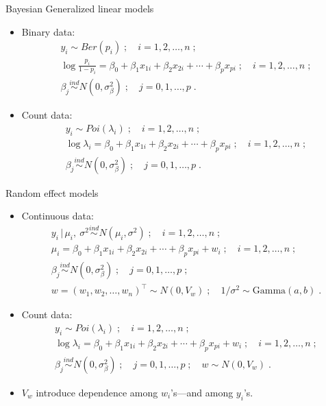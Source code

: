 \documentclass[10pt]{beamer}
\newcommand{\given}{\, | \,}
\begin{document}
\begin{frame}{Bayesian Generalized linear models}
 
 \begin{itemize}
  \item Binary data:
  \begin{multline*}
   y_i \sim Ber(p_i)\;;\quad i=1,2,\ldots,n\;;\\
   \log\frac{p_i}{1-p_i} = \beta_0 + \beta_1 x_{1i} + \beta_2 x_{2i} + \cdots + \beta_p x_{pi}\;;\quad i=1,2,\ldots,n\;; \\
   \beta_j \stackrel{ind}{\sim} N(0, \sigma^2_{\beta})\;; \quad j=0,1,\ldots,p\;. 
  \end{multline*}

  \item Count data:
  \begin{multline*}
   y_i \sim Poi(\lambda_i)\;;\quad i=1,2,\ldots,n\;;\\
   \log\lambda_i = \beta_0 + \beta_1 x_{1i} + \beta_2 x_{2i} + \cdots + \beta_p x_{pi}\;;\quad i=1,2,\ldots,n\;; \\
   \beta_j \stackrel{ind}{\sim} N(0, \sigma^2_{\beta})\;; \quad j=0,1,\ldots,p\;. 
  \end{multline*}
  
 \end{itemize}

\end{frame}

\begin{frame}{Random effect models}
 
 \begin{itemize}
  \item Continuous data:
   \begin{multline*}
  y_i \given \mu_i,\: \sigma^2 \stackrel{ind}{\sim} N(\mu_i, \sigma^2)\;;\quad i=1,2,\ldots,n\;; \\
  \mu_i = \beta_0 + \beta_1 x_{1i} + \beta_2 x_{2i} + \cdots + \beta_p x_{pi} + w_i\;;\quad i=1,2,\ldots,n\;; \\
  \beta_j \stackrel{ind}{\sim} N(0, \sigma^2_{\beta})\;;\quad j=0,1,\ldots,p\;; \\ 
  w = (w_1, w_2,\ldots, w_n)^{\top} \sim N(0,V_w)\;;\quad 1/\sigma^2 \sim \mbox{Gamma}(a,b)\;.
 \end{multline*}
 
 \item Count data:
 \begin{multline*}
   y_i \sim Poi(\lambda_i)\;;\quad i=1,2,\ldots,n\;;\\
   \log\lambda_i = \beta_0 + \beta_1 x_{1i} + \beta_2 x_{2i} + \cdots + \beta_p x_{pi} + w_i\;;\quad i=1,2,\ldots,n\;; \\
   \beta_j \stackrel{ind}{\sim} N(0, \sigma^2_{\beta})\;; \quad j=0,1,\ldots,p\;;\quad w \sim N(0,V_w)\;.  
  \end{multline*}
 
 \item $V_w$ introduce dependence among $w_i$'s---and among $y_i$'s. 
 \end{itemize}

\end{frame}
\end{document}
